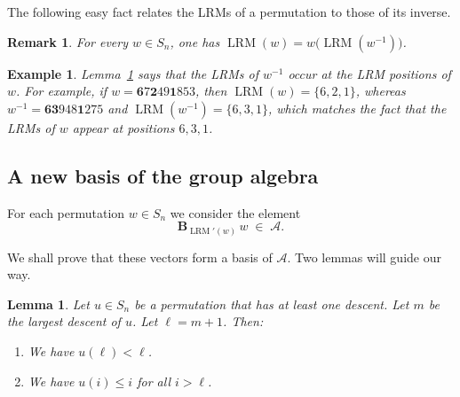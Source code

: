 \documentclass[submission]{FPSAC2026}
\newtheorem{lem}{Lemma}
\newtheorem{example}{Example}
\newtheorem{remark}{Remark}
\begin{document}
The following easy fact relates the LRMs of a permutation to those of its inverse.

\begin{remark}
\label{lem.LRM.inverse}
For every $w\in S_n$, one has
$\operatorname{LRM}(w)= w\bigl(\operatorname{LRM}(w^{-1})\bigr)$.
\end{remark}


\begin{example}
Lemma~\ref{lem.LRM.inverse} says that the LRMs of $w^{-1}$ occur at the \emph{LRM positions} of $w$.  
For example, if $w = \mathbf{6}7\mathbf{2}49\mathbf{1}853$,
then $\operatorname{LRM}(w)=\{6,2,1\}$,
whereas
$w^{-1} = \mathbf{63}948\mathbf{1}275$
and $\operatorname{LRM}(w^{-1})=\{6,3,1\}$,
which matches the fact that the LRMs of $w$ appear at positions $6,3,1$.
\end{example}

\subsection{A new basis of the group algebra}

For each permutation $w\in S_n$ we consider the element
\[
\mathbf{B}_{\operatorname{LRM}'(w)}\, w \;\in\; \mathcal{A}.
\]

We shall prove that these vectors form a basis of $\mathcal{A}$.
Two lemmas will guide our way.

\begin{lem}
\label{lem.lastdes}Let $u\in S_{n}$ be a permutation that has at least one
descent. Let $m$ be the largest descent of $u$. Let $\ell =m+1$. Then:

\begin{enumerate}
\item[\textbf{(a)}] We have $u\left( \ell \right) <\ell $.

\item[\textbf{(b)}] We have $u\left( i\right) \leq i$ for all $i>\ell $.
\end{enumerate}
\end{lem}
\end{document}
